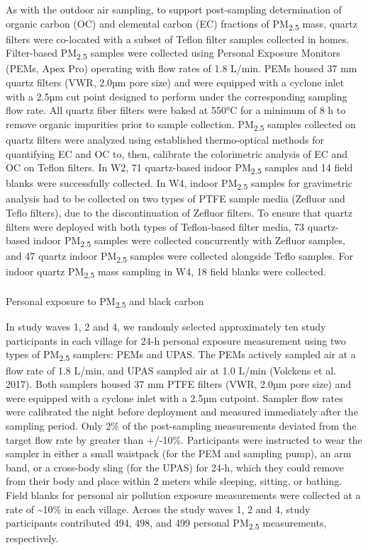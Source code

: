 \documentclass[
  letterpaper,
  DIV=11,
  numbers=noendperiod]{scrartcl}
\makeatletter
\let\oldparagraph\paragraph
\renewcommand{\paragraph}{
    \@ifstar
      \xxxParagraphStar
      \xxxParagraphNoStar
  }
\newcommand{\xxxParagraphStar}[1]{\oldparagraph*{#1}\mbox{}}
\newcommand{\xxxParagraphNoStar}[1]{\oldparagraph{#1}\mbox{}}
\makeatother
\begin{document}
As with the outdoor air sampling, to support post-sampling determination
of organic carbon (OC) and elemental carbon (EC) fractions of
PM\textsubscript{2.5} mass, quartz filters were co-located with a subset
of Teflon filter samples collected in homes. Filter-based
PM\textsubscript{2.5} samples were collected using Personal Exposure
Monitors (PEMs, Apex Pro) operating with flow rates of 1.8 L/min. PEMs
housed 37 mm quartz filters (VWR, 2.0µm pore size) and were equipped
with a cyclone inlet with a 2.5µm cut point designed to perform under
the corresponding sampling flow rate. All quartz fiber filters were
baked at 550°C for a minimum of 8 h to remove organic impurities prior
to sample collection. PM\textsubscript{2.5} samples collected on quartz
filters were analyzed using established thermo-optical methods for
quantifying EC and OC to, then, calibrate the colorimetric analysis of
EC and OC on Teflon filters. In W2, 71 quartz-based indoor
PM\textsubscript{2.5} samples and 14 field blanks were successfully
collected. In W4, indoor PM\textsubscript{2.5} samples for gravimetric
analysis had to be collected on two types of PTFE sample media (Zefluor
and Teflo filters), due to the discontinuation of Zefluor filters. To
ensure that quartz filters were deployed with both types of Teflon-based
filter media, 73 quartz-based indoor PM\textsubscript{2.5} samples were
collected concurrently with Zefluor samples, and 47 quartz indoor
PM\textsubscript{2.5} samples were collected alongside Teflo samples.
For indoor quartz PM\textsubscript{2.5} mass sampling in W4, 18 field
blanks were collected.

\paragraph{\texorpdfstring{Personal exposure to PM\textsubscript{2.5}
and black
carbon}{Personal exposure to PM2.5 and black carbon}}\label{personal-exposure-to-pm2.5-and-black-carbon}

In study waves 1, 2 and 4, we randomly selected approximately ten study
participants in each village for 24-h personal exposure measurement
using two types of PM\textsubscript{2.5} samplers: PEMs and UPAS. The
PEMs actively sampled air at a flow rate of 1.8 L/min, and UPAS sampled
air at 1.0 L/min (Volckens et al. 2017). Both samplers housed 37 mm PTFE
filters (VWR, 2.0µm pore size) and were equipped with a cyclone inlet
with a 2.5µm cutpoint. Sampler flow rates were calibrated the night
before deployment and measured immediately after the sampling period.
Only 2\% of the post-sampling measurements deviated from the target flow
rate by greater than +/-10\%. Participants were instructed to wear the
sampler in either a small waistpack (for the PEM and sampling pump), an
arm band, or a cross-body sling (for the UPAS) for 24-h, which they
could remove from their body and place within 2 meters while sleeping,
sitting, or bathing. Field blanks for personal air pollution exposure
measurements were collected at a rate of \textasciitilde10\% in each
village. Across the study waves 1, 2 and 4, study participants
contributed 494, 498, and 499 personal PM\textsubscript{2.5}
measurements, respectively.
\end{document}
